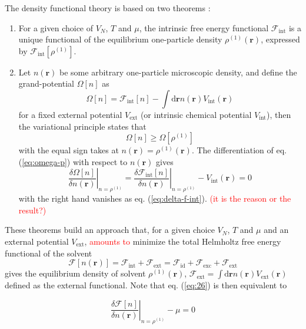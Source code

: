 The density functional theory is based on two theorems :
\begin{enumerate}
\item For a given choice of $V_{N}$, $T$ and $\mu$, the intrinsic free
energy functional $\mathcal{F}_{\mathrm{int}}$ is a unique functional
of the equilibrium one-particle density $\rho^{(1)}(\mathbf{r})$,
expressed by $\mathcal{F}_{\mathrm{int}}[\rho^{(1)}]$.
\item Let $n(\mathbf{r})$ be some arbitrary one-particle microscopic density,
and define the grand-potential $\Omega[n]$ as
\begin{equation}
\Omega[n]=\mathcal{F}_{\mathrm{int}}[n]-\int\mathrm{d}\mathbf{r}n(\mathbf{r})V_{\mathrm{int}}(\mathbf{r})\label{eq:omega-p}
\end{equation}
for a fixed external potential $V_{\mathrm{ext}}$ (or intrinsic chemical
potential $V_{\mathrm{int}}$), then the variational principle states
that
\begin{equation}
\Omega[n]\geq\Omega[\rho^{(1)}]
\end{equation}
with the equal sign takes at $n(\mathbf{r})=\rho^{(1)}(\mathbf{r})$.
The differentiation of eq. (\ref{eq:omega-p}) with respect to $n(\mathbf{r})$
gives
\begin{equation}
\left.\frac{\delta\Omega[n]}{\delta n(\mathbf{r})}\right|_{n=\rho^{(1)}}=\left.\frac{\delta\mathcal{F}_{\mathrm{int}}[n]}{\delta n(\mathbf{r})}\right|_{n=\rho^{(1)}}-V_{\mathrm{int}}(\mathbf{r})=0\label{eq:26}
\end{equation}
with the right hand vanishes as eq. (\ref{eq:delta-f-int}). \textcolor{red}{(it
is the reason or the result?)}
\end{enumerate}
These theorems build an approach that, for a given choice $V_{N}$,
$T$ and $\mu$ and an external potential $V_{\mathrm{ext}}$, \textcolor{red}{amounts
to} minimize the total Helmholtz free energy functional of the solvent
\begin{equation}
\mathcal{F}[n(\mathbf{r})]=\mathcal{F}_{\mathrm{int}}+\mathcal{F}_{\mathrm{ext}}=\mathcal{F}_{\mathrm{id}}+\mathcal{F}_{\mathrm{exc}}+\mathcal{F}_{\mathrm{ext}}
\end{equation}
gives the equilibrium density of solvent $\rho^{(1)}(\mathbf{r})$,
$\mathcal{F}_{\mathrm{ext}}=\int\mathrm{d}\mathbf{r}n(\mathbf{r})V_{\mathrm{ext}}(\mathbf{r})$
defined as the external functional. Note that eq. (\ref{eq:26}) is
then equivalent to

\begin{equation}
\left.\frac{\delta\mathcal{F}[n]}{\delta n(\mathbf{r})}\right|_{n=\rho^{(1)}}-\mu=0
\end{equation}

